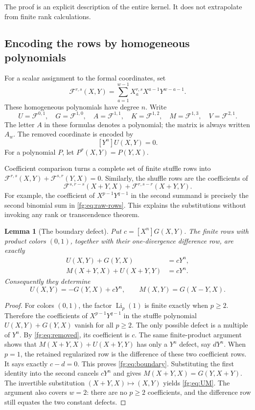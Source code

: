 \documentclass[11pt,a4paper]{article}
\newtheorem{lemma}[theorem]{Lemma}
\theoremstyle{definition}
\theoremstyle{remark}
\numberwithin{equation}{section}
\begin{document}
The proof is an explicit description of the entire kernel. It does not
extrapolate from finite rank calculations.

\subsection{Encoding the rows by homogeneous polynomials}

For a scalar assignment to the formal coordinates, set
\[
 \mathscr F^{r,s}(X,Y)
   =\sum_{a=1}^{w-1}X_a^{r,s}X^{a-1}Y^{w-a-1}.
\]
These homogeneous polynomials have degree $n$. Write
\[
 U=\mathscr F^{0,1},\quad G=\mathscr F^{1,0},\quad
 A=\mathscr F^{1,1},\quad K=\mathscr F^{1,2},\quad
 M=\mathscr F^{1,3},\quad V=\mathscr F^{2,1}.
\]
The letter $A$ in these formulas denotes a polynomial; the matrix is
always written $A_w$. The removed coordinate is encoded by
\begin{equation}\label{fg:eq:removed}
 [Y^n]U(X,Y)=0.
\end{equation}
For a polynomial $P$, let $P^\sigma(X,Y)=P(Y,X)$.

Coefficient comparison turns a complete set of finite stuffle rows into
$\mathscr F^{r,s}(X,Y)+\mathscr F^{s,r}(Y,X)=0$. Similarly, the shuffle
rows are the coefficients of
\[
 \mathscr F^{s,r-s}(X+Y,X)
   +\mathscr F^{r,s-r}(X+Y,Y).
\]
For example, the coefficient of $X^{p-1}Y^{q-1}$ in the second summand
is precisely the second binomial sum in
\eqref{fg:eq:raw-rows}. This explains the substitutions without invoking
any rank or transcendence theorem.

\begin{lemma}[The boundary defect]\label{fg:lem:boundary}
Put $c=[X^n]G(X,Y)$. The finite rows with product colors $(0,1)$,
together with their one-divergence difference row, are exactly
\begin{align}
 U(X,Y)+G(Y,X)&=cY^n,\\
 M(X+Y,X)+U(X+Y,Y)&=cY^n.
 \label{fg:eq:boundary}
\end{align}
Consequently they determine
\begin{equation}\label{fg:eq:UM}
 U(X,Y)=-G(Y,X)+cY^n,
 \qquad M(X,Y)=G(X-Y,X).
\end{equation}
\end{lemma}
\begin{proof}
For colors $(0,1)$, the factor $\operatorname{Li}_p(1)$ is finite
exactly when $p\ge2$. Therefore the coefficients of
$X^{p-1}Y^{q-1}$ in the stuffle polynomial
$U(X,Y)+G(Y,X)$ vanish for all $p\ge2$. The only possible defect is
a multiple of $Y^n$. By \eqref{fg:eq:removed}, its coefficient is $c$.
The same finite-product argument shows that
$M(X+Y,X)+U(X+Y,Y)$ has only a $Y^n$ defect, say $dY^n$.
When $p=1$, the retained regularized row is the difference of these
two coefficient rows. It says exactly $c-d=0$. This proves
\eqref{fg:eq:boundary}. Substituting the first identity into the
second cancels $cY^n$ and gives
$M(X+Y,X)=G(Y,X+Y)$. The invertible substitution
$(X+Y,X)\mapsto(X,Y)$ yields \eqref{fg:eq:UM}.
The argument also covers $w=2$: there are no $p\ge2$ coefficients,
and the difference row still equates the two constant defects.
\end{proof}
\end{document}
